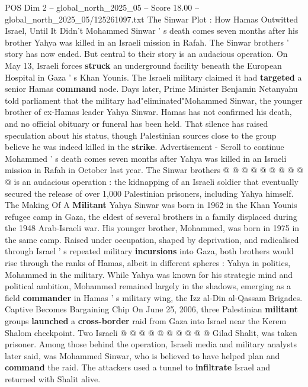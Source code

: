 \begin{textsample}{POS Dim 2 – global\_north\_2025\_05 – Score 18.00 – global\_north\_2025\_05/125261097.txt}  \label{ex:f2_pos_408}
The Sinwar Plot : How Hamas Outwitted Israel, Until It Didn't Mohammed Sinwar ' s death comes seven months after his brother Yahya was killed in an Israeli mission in Rafah.
The Sinwar brothers ' story has now ended.
But central to their story is an audacious operation.
On May 13, Israeli forces \textbf{struck} an underground facility beneath the European Hospital in Gaza ' s Khan Younis.
The Israeli military claimed it had \textbf{targeted} a senior Hamas \textbf{command} node.
Days later, Prime Minister Benjamin Netanyahu told parliament that the military had"eliminated"Mohammed Sinwar, the younger brother of ex-Hamas leader Yahya Sinwar.
Hamas has not confirmed his death, and no official obituary or funeral has been held.
That silence has raised speculation about his status, though Palestinian sources close to the group believe he was indeed killed in the \textbf{strike}.
Advertisement - Scroll to continue Mohammed ' s death comes seven months after Yahya was killed in an Israeli mission in Rafah in October last year.
The Sinwar brothers @ @ @ @ @ @ @ @ @ @ is an audacious operation : the kidnapping of an Israeli soldier that eventually secured the release of over 1,000 Palestinian prisoners, including Yahya himself.
The Making Of A \textbf{Militant} Yahya Sinwar was born in 1962 in the Khan Younis refugee camp in Gaza, the eldest of several brothers in a family displaced during the 1948 Arab-Israeli war.
His younger brother, Mohammed, was born in 1975 in the same camp.
Raised under occupation, shaped by deprivation, and radicalised through Israel ' s repeated military \textbf{incursions} into Gaza, both brothers would rise through the ranks of Hamas, albeit in different spheres : Yahya in politics, Mohammed in the military.
While Yahya was known for his strategic mind and political ambition, Mohammed remained largely in the shadows, emerging as a field \textbf{commander} in Hamas ' s military wing, the Izz al-Din al-Qassam Brigades.
Captive Becomes Bargaining Chip On June 25, 2006, three Palestinian \textbf{militant} groups \textbf{launched} a \textbf{cross-border} raid from Gaza into Israel near the Kerem Shalom checkpoint.
Two Israeli @ @ @ @ @ @ @ @ @ @ Gilad Shalit, was taken prisoner.
Among those behind the operation, Israeli media and military analysts later said, was Mohammed Sinwar, who is believed to have helped plan and \textbf{command} the raid.
The attackers used a tunnel to \textbf{infiltrate} Israel and returned with Shalit alive.

\end{textsample}
